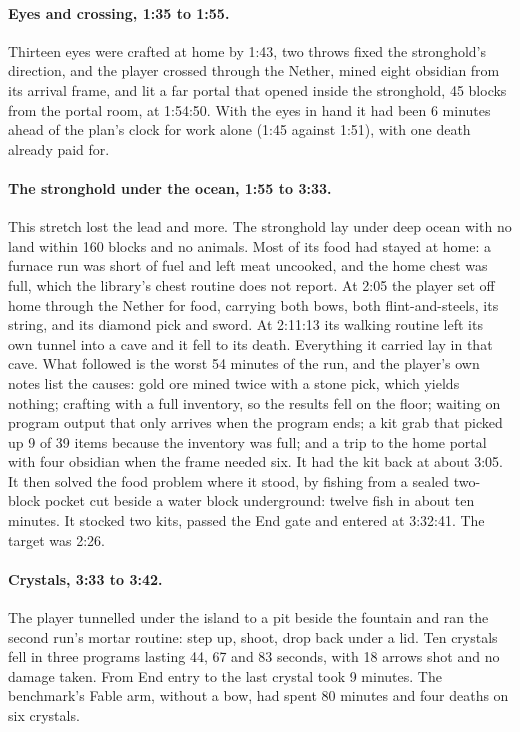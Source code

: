 \documentclass[11pt,a4paper]{article}
\begin{document}
\paragraph{Eyes and crossing, 1:35 to 1:55.} Thirteen eyes were crafted at home by 1:43, two throws fixed the stronghold's direction, and the player crossed through the Nether, mined eight obsidian from its arrival frame, and lit a far portal that opened inside the stronghold, 45 blocks from the portal room, at 1:54:50. With the eyes in hand it had been 6 minutes ahead of the plan's clock for work alone (1:45 against 1:51), with one death already paid for.

\paragraph{The stronghold under the ocean, 1:55 to 3:33.} This stretch lost the lead and more. The stronghold lay under deep ocean with no land within 160 blocks and no animals. Most of its food had stayed at home: a furnace run was short of fuel and left meat uncooked, and the home chest was full, which the library's chest routine does not report. At 2:05 the player set off home through the Nether for food, carrying both bows, both flint-and-steels, its string, and its diamond pick and sword. At 2:11:13 its walking routine left its own tunnel into a cave and it fell to its death. Everything it carried lay in that cave. What followed is the worst 54 minutes of the run, and the player's own notes list the causes: gold ore mined twice with a stone pick, which yields nothing; crafting with a full inventory, so the results fell on the floor; waiting on program output that only arrives when the program ends; a kit grab that picked up 9 of 39 items because the inventory was full; and a trip to the home portal with four obsidian when the frame needed six. It had the kit back at about 3:05. It then solved the food problem where it stood, by fishing from a sealed two-block pocket cut beside a water block underground: twelve fish in about ten minutes. It stocked two kits, passed the End gate and entered at 3:32:41. The target was 2:26.

\paragraph{Crystals, 3:33 to 3:42.}\label{sec:end} The player tunnelled under the island to a pit beside the fountain and ran the second run's mortar routine: step up, shoot, drop back under a lid. Ten crystals fell in three programs lasting 44, 67 and 83 seconds, with 18 arrows shot and no damage taken. From End entry to the last crystal took 9 minutes. The benchmark's Fable arm, without a bow, had spent 80 minutes and four deaths on six crystals.
\end{document}
